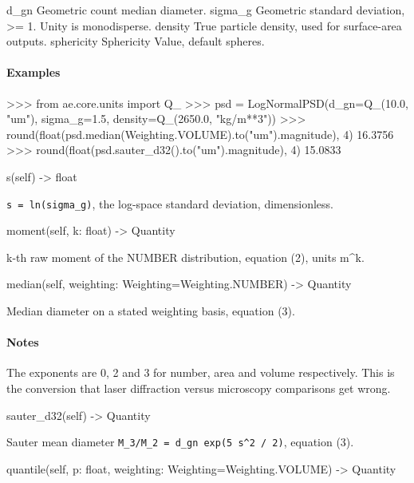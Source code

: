 \documentclass[10pt,a4paper,twoside]{report}
\begin{document}
d\_gn Geometric count median diameter. sigma\_g Geometric standard deviation, >= 1. Unity is monodisperse. density True particle density, used for surface-area outputs. sphericity Sphericity Value, default spheres.

\paragraph*{Examples}

\begin{doctestblock}
>>> from ae.core.units import Q_
>>> psd = LogNormalPSD(d_gn=Q_(10.0, "um"), sigma_g=1.5, density=Q_(2650.0, "kg/m**3"))
>>> round(float(psd.median(Weighting.VOLUME).to("um").magnitude), 4)
16.3756
>>> round(float(psd.sauter_d32().to("um").magnitude), 4)
15.0833
\end{doctestblock}

\begin{verbatimsmall}
s(self) -> float
\end{verbatimsmall}

\texttt{s = ln(sigma\_g)}, the log-space standard deviation, dimensionless.

\begin{verbatimsmall}
moment(self, k: float) -> Quantity
\end{verbatimsmall}

k-th raw moment of the NUMBER distribution, equation (2), units m\textasciicircum{}k.

\begin{verbatimsmall}
median(self, weighting: Weighting=Weighting.NUMBER) -> Quantity
\end{verbatimsmall}

Median diameter on a stated weighting basis, equation (3).

\paragraph*{Notes}

The exponents are 0, 2 and 3 for number, area and volume respectively. This is the conversion that laser diffraction versus microscopy comparisons get wrong.

\begin{verbatimsmall}
sauter_d32(self) -> Quantity
\end{verbatimsmall}

Sauter mean diameter \texttt{M\_3/M\_2 = d\_gn exp(5 s\textasciicircum{}2 / 2)}, equation (3).

\begin{verbatimsmall}
quantile(self, p: float, weighting: Weighting=Weighting.VOLUME) -> Quantity
\end{verbatimsmall}
\end{document}
